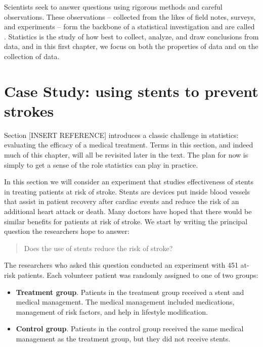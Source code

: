 \documentclass[]{book}
\providecommand{\tightlist}{%
  \setlength{\itemsep}{0pt}\setlength{\parskip}{0pt}}
\begin{document}
Scientists seek to answer questions using rigorous methods and careful observations.
These observations -- collected from the likes of field notes, surveys, and experiments -- form the backbone of a statistical investigation and are called .
Statistics is the study of how best to collect, analyze, and draw conclusions from data, and in this first chapter, we focus on both the properties of data and on the collection of data.

\hypertarget{case-study-using-stents-to-prevent-strokes}{%
\section{Case Study: using stents to prevent strokes}\label{case-study-using-stents-to-prevent-strokes}}

Section {[}INSERT REFERENCE{]} introduces a classic challenge in statistics: evaluating the efficacy of a medical treatment.
Terms in this section, and indeed much of this chapter, will all be revisited later in the text.
The plan for now is simply to get a sense of the role statistics can play in practice.

In this section we will consider an experiment that studies effectiveness of stents in treating patients at risk of stroke.
Stents are devices put inside blood vessels that assist in patient recovery after cardiac events and reduce the risk of an additional heart attack or death.
Many doctors have hoped that there would be similar benefits for patients at risk of stroke. We start by writing the principal question the researchers hope to answer:

\begin{quote}
Does the use of stents reduce the risk of stroke?
\end{quote}

The researchers who asked this question conducted an experiment with 451 at-risk patients. Each volunteer patient was randomly assigned to one of two groups:

\begin{itemize}
\tightlist
\item
  \textbf{Treatment group}. Patients in the treatment group received a stent and medical management.
  The medical management included medications, management of risk factors, and help in lifestyle modification.
\item
  \textbf{Control group}. Patients in the control group received the same medical management as the treatment group, but they did not receive stents.
\end{itemize}
\end{document}
